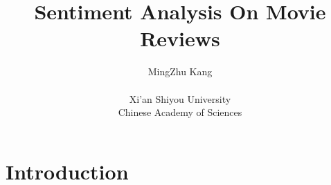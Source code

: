 \documentclass[
 size=14pt,
 paper=smartboard,  %
 mode=present, 		%
 display=slides, 	%
 style=tuliplab,  	%
 pauseslide,
 fleqn,leqno]{powerdot}
\title{Sentiment Analysis On Movie Reviews}
\author{
MingZhu Kang 
\\
\\Xi'an Shiyou University
\\Chinese Academy of Sciences
}
\begin{document}
\maketitle





\section{Introduction}
\end{document}
